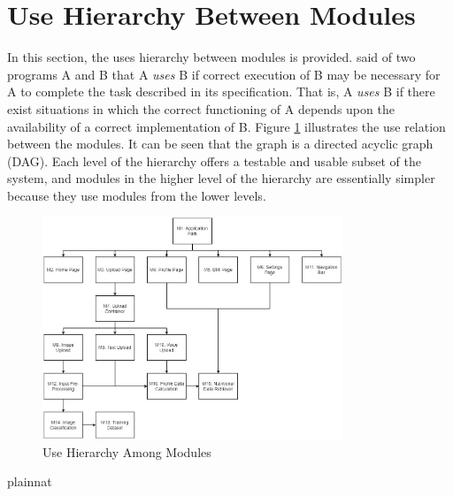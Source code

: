 \documentclass[12pt, titlepage]{article}
\begin{document}
\section{Use Hierarchy Between Modules} \label{SecUse}

In this section, the uses hierarchy between modules is
provided. \citet{Parnas1978} said of two programs A and B that A {\em uses} B if
correct execution of B may be necessary for A to complete the task described in
its specification. That is, A {\em uses} B if there exist situations in which
the correct functioning of A depends upon the availability of a correct
implementation of B.  Figure \ref{FigUH} illustrates the use relation between
the modules. It can be seen that the graph is a directed acyclic graph
(DAG). Each level of the hierarchy offers a testable and usable subset of the
system, and modules in the higher level of the hierarchy are essentially simpler
because they use modules from the lower levels.

\begin{figure}[H]
\centering
\includegraphics[width=0.8\textwidth]{uses_hierarchy.jpg}
\caption{Use Hierarchy Among Modules}
\label{FigUH}
\end{figure}


 {plainnat}

\end{document}
